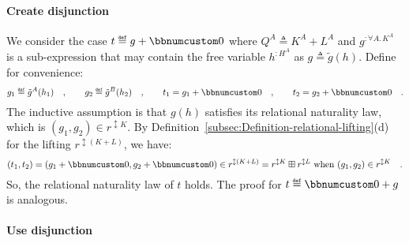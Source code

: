 \paragraph{Create disjunction}

We consider the case $t\triangleq g+\bbnum 0$ where $Q^{A}\triangleq K^{A}+L^{A}$
and $g^{:\forall A.\,K^{A}}$ is a sub-expression that may contain
the free variable $h^{:H^{A}}$ as $g\triangleq\tilde{g}(h)$. Define
for convenience: 
\[
g_{1}\triangleq\tilde{g}^{A}(h_{1})\quad,\quad\quad g_{2}\triangleq\tilde{g}^{B}(h_{2})\quad,\quad\quad t_{1}=g_{1}+\bbnum 0\quad,\quad\quad t_{2}=g_{2}+\bbnum 0\quad.
\]
The inductive assumption is that $g(h)$ satisfies its relational
naturality law, which is $(g_{1},g_{2})\in r^{\updownarrow K}$. By
Definition~\ref{subsec:Definition-relational-lifting}(d) for the
lifting $r^{\updownarrow(K+L)}$, we have:
\[
(t_{1},t_{2})=(g_{1}+\bbnum 0,g_{2}+\bbnum 0)\in r^{\updownarrow(K+L)}=r^{\updownarrow K}\boxplus r^{\updownarrow L}\text{ when }(g_{1},g_{2})\in r^{\updownarrow K}\quad.
\]
So, the relational naturality law of $t$ holds. The proof for $t\triangleq\bbnum 0+g$
is analogous.

\paragraph{Use disjunction}

